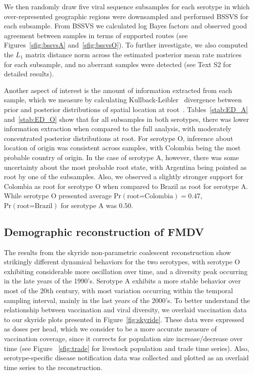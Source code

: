 \documentclass[10pt]{article}
\begin{document}
We then randomly draw five viral sequence subsamples for each serotype in which over-represented geographic regions were downsampled and performed BSSVS for each subsample.
From BSSVS we calculated log Bayes factors and observed good agreement between samples in terms of supported routes (see Figures~\ref{sfig:bssvsA} and~\ref{sfig:bssvsO}).
To further investigate, we also computed the $L_1$ matrix distance norm across the estimated posterior mean rate matrices for each subsample, and no aberrant samples were detected (see Text S2 for detailed results).

Another aspect of interest is the amount of information extracted from each sample, which we measure by calculating Kullback-Leibler~\cite{KL} divergence between prior and posterior distributions of spatial location at root~\cite{roots}.
Tables~\ref{stab:ED_A} and~\ref{stab:ED_O} show that for all subsamples in both serotypes, there was lower information extraction when compared to the full analysis, with moderately concentrated posterior distributions at root.
For serotype O, inference about location of origin was consistent across samples, with Colombia being the most probable country of origin.
In the case of serotype A, however, there was some uncertainty about the most probable root state, with Argentina being pointed as root by one of the subsamples.
Also, we observed a slightly stronger support for Colombia as root for serotype O when compared to Brazil as root for serotype A.
While serotype O presented average $\mbox{Pr}(\text{root=Colombia})=0.47$, $\mbox{Pr}(\text{root=Brazil})$ for serotype A was $0.50$.

\subsection*{Demographic reconstruction of FMDV}

The results from the skyride non-parametric coalescent reconstruction show strikingly different dynamical behaviors for the two serotypes, with serotype O exhibiting considerable more oscillation over time, and a diversity peak occurring in the late years of the 1990's.
Serotype A exhibits a more stable behavior over most of the 20th century, with most variation occurring within the temporal sampling interval, mainly in the last years of the 2000's.
To better understand the relationship between vaccination and viral diversity, we overlaid vaccination data to our skyride plots presented in Figure~\ref{fig:skyride}.
These data were expressed as doses per head, which we consider to be a more accurate measure of vaccination coverage, since it corrects for population size increase/decrease over time (see Figure ~\ref{sfig:trade} for livestock population and trade time series). 
Also, serotype-specific disease notification data was collected and plotted as an overlaid time series to the reconstruction. 
\end{document}
